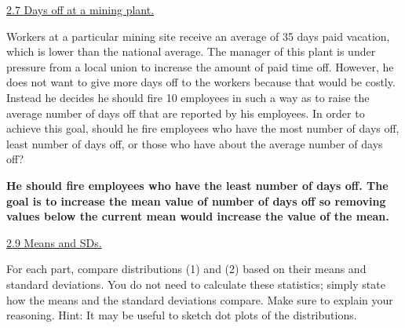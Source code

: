 \documentclass[10pt,letterpaper,unboxed,cm]{exam}
\begin{document}
\begin{questions}
	\question \underline{2.7 Days off at a mining plant.}

    Workers at a particular mining site receive an average of 35 days paid vacation, which is lower than the national average. The manager of this plant is under pressure from a local union to increase the amount of paid time off. However, he does not want to give more days off to the workers because that would be costly. Instead he decides he should fire 10 employees in such a way as to raise the average number of days off that are reported by his employees. In order to achieve this goal, should he fire employees who have the most number of days off, least number of days off, or those who have about the average number of days off?
    
    \bigskip
    {\bf He should fire employees who have the least number of days off. The goal is to increase the mean value of number of days off so removing values below the current mean would increase the value of the mean.} 
    \bigskip



	\question \underline{2.9 Means and SDs.}

    For each part, compare distributions (1) and (2) based on their means and standard deviations. You do not need to calculate these statistics; simply state how the means and the standard deviations compare. Make sure to explain your reasoning. Hint: It may be useful to sketch dot plots of the distributions.
    
\end{questions}
\end{document}
